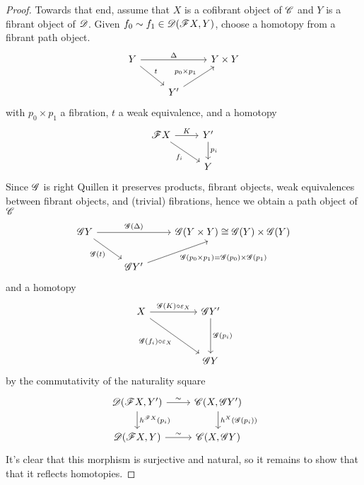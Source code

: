 \documentclass[10pt]{amsart}
\begin{document}
\begin{lem}
\begin{proof}
    
    Towards that end, assume that $X$ is a cofibrant object of $\mathscr{C}$ and $Y$ is a fibrant object of $\mathscr{D}$.
    Given $f_0 \sim f_1 \in \mathscr{D}(\mathscr{F} X, Y)$, choose a homotopy from a fibrant path object.
    $$\begin{tikzcd}
      Y \arrow{rr}{\Delta}\arrow{rd}{t} & & Y \times Y\\
      & Y^\prime \arrow{ur}{p_0 \times p_1}
    \end{tikzcd}$$
    with $p_0 \times p_1$ a fibration, $t$ a weak equivalence, and a homotopy
    $$\begin{tikzcd}
      \F X \arrow{r}{K}\arrow[swap]{rd}{f_i} & Y^\prime \arrow{d}{p_i}\\
      & Y
    \end{tikzcd}$$
    Since $\mathscr{G}$ is right Quillen it preserves products, fibrant objects, weak equivalences between fibrant objects, and (trivial) fibrations, hence we obtain a path object of $\mathscr{C}$
    $$\begin{tikzcd}
      \G Y \arrow{rr}{\G(\Delta)}\arrow[swap]{rd}{\G(t)} && \G(Y \times Y) \cong \G(Y) \times \G(Y)\\
      & \G Y^\prime \arrow[swap]{ur}{\G(p_0 \times p_1) = \G(p_0) \times \G(p_1)}
    \end{tikzcd}$$
    and a homotopy
    $$\begin{tikzcd}
      X \arrow{rr}{\G(K) \circ \varepsilon_X}\arrow[swap]{rrdd}{\G(f_i) \circ \varepsilon_X} && \G Y^\prime \arrow{dd}{\G(p_i)}\\
      \\
      & & \G Y
    \end{tikzcd}$$
    by the commutativity of the naturality square
    $$\begin{tikzcd}
      \D(\F X, Y^\prime) \arrow{r}{\sim}\arrow{d}{h^{\F X}(p_i)} & \C(X, \G Y^\prime)\arrow{d}{h^X(\G(p_i))}\\
      \D(\F X, Y) \arrow{r}{\sim} & \C(X, \G Y)
    \end{tikzcd}$$
    It's clear that this morphism is surjective and natural, so it remains to show that that it reflects homotopies.
    

\end{proof}
\end{lem}
\end{document}
